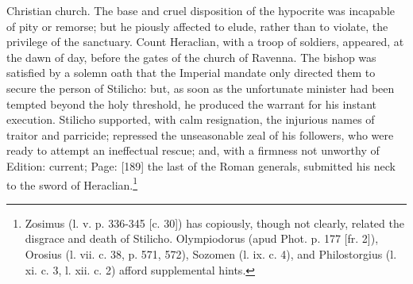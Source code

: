 Christian church. The base and cruel disposition of the hypocrite was incapable of pity or remorse; but he piously affected to elude, rather than to violate, the privilege of the sanctuary. Count Heraclian, with a troop of soldiers, appeared, at the dawn of day, before the gates of the church of Ravenna. The bishop was satisfied by a solemn oath that the Imperial mandate only directed them to secure the person of Stilicho: but, as soon as the unfortunate minister had been tempted beyond the holy threshold, he produced the warrant for his instant execution. Stilicho supported, with calm resignation, the injurious names of traitor and parricide; repressed the unseasonable zeal of his followers, who were ready to attempt an ineffectual rescue; and, with a firmness not unworthy of Edition: current; Page: [189] the last of the Roman generals, submitted his neck to the sword of Heraclian.\footnote{Zosimus (l. v. p. 336-345 [c. 30]) has copiously, though not clearly, related the disgrace and death of Stilicho. Olympiodorus (apud Phot. p. 177 [fr. 2]), Orosius (l. vii. c. 38, p. 571, 572), Sozomen (l. ix. c. 4), and Philostorgius (l. xi. c. 3, l. xii. c. 2) afford supplemental hints.}

